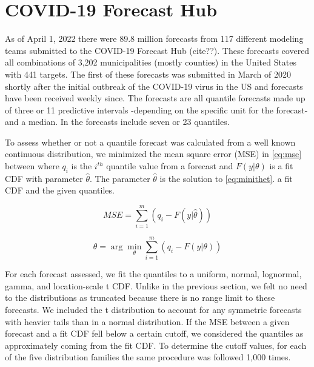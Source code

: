 \documentclass[11pt,notitlepage]{isuthesis}
\begin{document}
\section{COVID-19 Forecast Hub}

As of April 1, 2022 there were 89.8 million forecasts  
from 117 different modeling teams submitted to the COVID-19 Forecast Hub (cite??). 
These 
forecasts covered all combinations of 3,202 municipalities (mostly counties) 
in the United States with 441 targets. The first of these forecasts was 
submitted in March of 2020 shortly after the initial outbreak of the COVID-19 
virus in 
the US and forecasts have been received weekly since. 
The forecasts are all quantile forecasts made up of three or 11 predictive 
intervals -depending on the specific unit for the forecast-
and a median. In the forecasts include seven or 23 quantiles.

To assess whether or not a quantile forecast was calculated from a well
known continuous distribution, we minimized the mean square error (MSE)  
in \eqref{eq:mse} between where $q_i$ is
the $i^{th}$ quantile value from a forecast and $F(y| \theta)$ is a fit CDF with 
parameter $\hat{\theta}$. The parameter $\hat{\theta}$ is the solution to 
\eqref{eq:minithet}.
a fit CDF and the given quantiles.

\begin{equation}
  MSE = \sum_{i=1}^m (q_i - F(y| \hat{\theta}))
  \label{eq:mse}
\end{equation}

\begin{equation}
  \hat{\theta} = \arg\min_{\theta} \sum_{i=1}^m (q_i - F(y| \theta))
  \label{eq:minthet}
\end{equation}




For each forecast assessed, we fit the quantiles to a uniform, normal, 
lognormal,
gamma, and location-scale t CDF. Unlike in the previous section, we felt no need
to the distributions as truncated because there is no range limit to these 
forecasts. We included the t distribution to account for any
symmetric forecasts with heavier tails than in a normal distribution.
If the MSE between a given forecast and a fit CDF fell below a certain cutoff,
we considered the quantiles as approximately coming from the fit CDF. To
determine the cutoff values, for each of the five distribution families the same
procedure was followed 1,000 times. 
\end{document}
